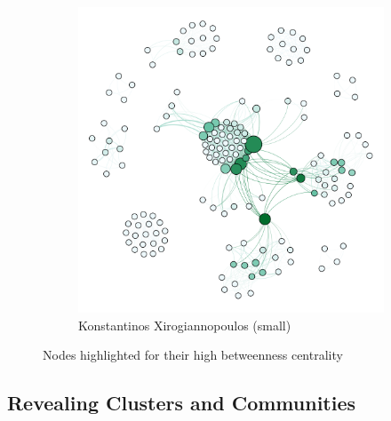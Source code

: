 \documentclass[11pt,letterpaper]{article}
\begin{document}
\begin{figure}[h]
\begin{subfigure}{0.49\textwidth}
		\includegraphics[width=\textwidth]{figures/kostas_centrality.png}
		\caption{\textsf{Konstantinos Xirogiannopoulos (small)}}
        \label{fig:kostas_centrality}
	\end{subfigure}
    \caption{\textsf{Nodes highlighted for their high betweenness centrality}}
    \label{fig:centrality}
\end{figure}

\subsection*{Revealing Clusters and Communities}
\end{document}
